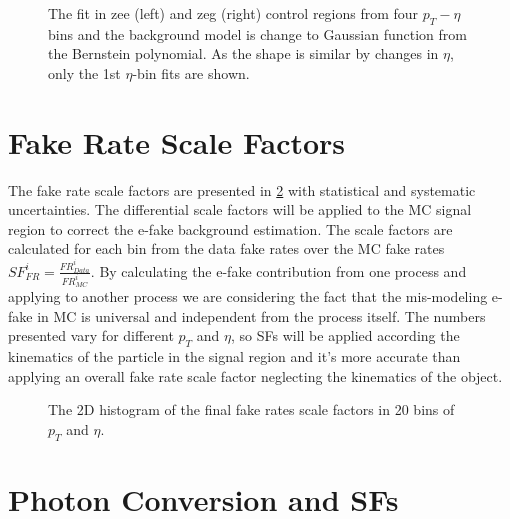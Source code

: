 \begin{figure}[H]
\begin{center}
\scalebox{0.35}{}\scalebox{0.35}{}
\scalebox{0.35}{}\scalebox{0.35}{}
\scalebox{0.35}{}\scalebox{0.35}{}
\scalebox{0.35}{}\scalebox{0.35}{}
\caption{The fit in zee (left) and zeg (right) control regions from four $p_{T}-\eta$ bins and the background model is change to Gaussian function from the Bernstein polynomial. As the shape is similar by changes in $\eta$, only the 1st $\eta$-bin fits are shown.}
\label{fig:fit_sys3}
\end{center}
\end{figure}

\section{Fake Rate Scale Factors}
\label{fcsfs}

The fake rate scale factors are presented in \ref{fig:h2_sf_final} with statistical and systematic uncertainties. The differential scale factors will be applied to the MC signal region to correct the e-fake background estimation. The scale factors are calculated for each bin from the data fake rates over the MC fake rates $SF_{FR}^i = \frac{FR_{Data}^i}{FR_{MC}^i}$. By calculating the e-fake contribution from one process and applying to another process we are considering the fact that the mis-modeling e-fake in MC is universal and independent from the process itself. The numbers presented vary for different $p_{T}$ and $\eta$, so SFs will be applied according the kinematics of the particle in the signal region and it's more accurate than applying an overall fake rate scale factor neglecting the kinematics of the object.

\begin{figure}[H]
\begin{center}
\scalebox{0.6}{}
\caption{The 2D histogram of the final fake rates scale factors in 20 bins of $p_{T}$ and $\eta$.}
\label{fig:h2_sf_final}
\end{center}
\end{figure}

\section{Photon Conversion and SFs}
\label{phconversion}

